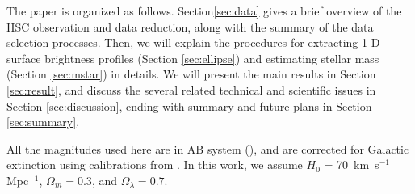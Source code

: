 \documentclass{emulateapj}
\begin{document}
\begin{CJK*}{UTF8}{gbsn}
    The paper is organized as follows. Section\ref{sec:data} gives a brief overview of 
    the HSC observation and data reduction, along with the summary of the data selection
    processes.  
    Then, we will explain the procedures for extracting 1-D surface brightness profiles 
    (Section \ref{sec:ellipse}) and estimating stellar mass (Section \ref{sec:mstar}) in
    details.   
    We will present the main results in Section \ref{sec:result}, and discuss the several 
    related technical and scientific issues in Section \ref{sec:discussion}, ending with
    summary and future plans in Section \ref{sec:summary}.

    All the magnitudes used here are in AB system (\citealt{Oke1983}), and are corrected 
    for Galactic extinction using calibrations from \citet{Schlafly11}.
    In this work, we assume $H_0$ = 70~km~s$^{-1}$ Mpc$^{-1}$, ${\Omega}_m=0.3$, 
    and ${\Omega}_{\lambda}=0.7$. 
    


\end{CJK*}
\end{document}
